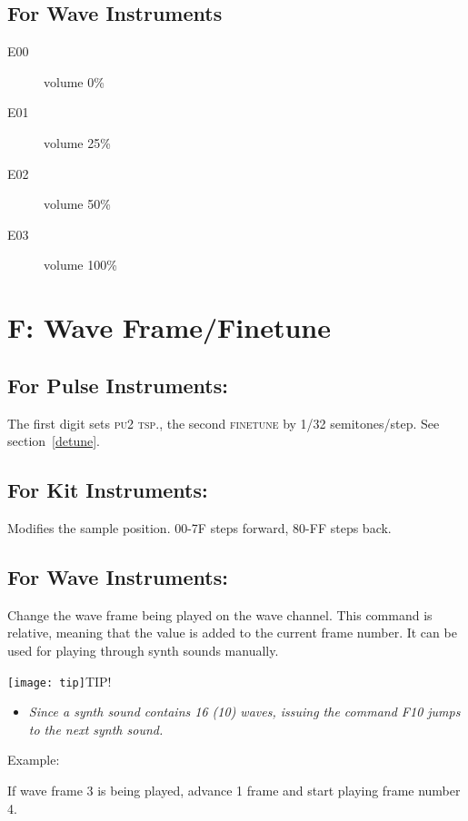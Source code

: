 \subsection{For Wave Instruments}
\begin{description}
\item[E00] volume 0\%
\item[E01] volume 25\%
\item[E02] volume 50\%
\item[E03] volume 100\%
\end{description}

\section{F: Wave Frame/Finetune}

\subsection{For Pulse Instruments:}
The first digit sets \textsc{pu2 tsp.}, the second \textsc{finetune} by 1/32 semitones/step.
See section~\ref{detune}.

\subsection{For Kit Instruments:}
Modifies the sample position. 00-7F steps forward, 80-FF steps back.

\subsection{For Wave Instruments:}
Change the wave frame being played on the wave channel. This command is relative, meaning that the value is added to the current frame number. It can be used for playing through synth sounds manually.

\texttt{[image: tip]}TIP!
\begin{itemize}
        \item \textit{Since a synth sound contains 16 (10) waves, issuing the command \textsc{F10} jumps to the next synth sound.}
	\end{itemize}

\begin{description}
\item Example:
\item[F01] If wave frame 3 is being played, advance 1 frame and start playing frame number 4.
\end{description}

